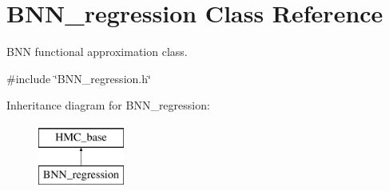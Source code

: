 \hypertarget{class_b_n_n__regression}{\section{B\-N\-N\-\_\-regression Class Reference}
\label{class_b_n_n__regression}
}


B\-N\-N functional approximation class.  




{\ttfamily \#include \char`\"{}B\-N\-N\-\_\-regression.\-h\char`\"{}}

Inheritance diagram for B\-N\-N\-\_\-regression\-:\begin{figure}[H]
\begin{center}
\leavevmode
\includegraphics[height=2.000000cm]{class_b_n_n__regression}
\end{center}
\end{figure}
